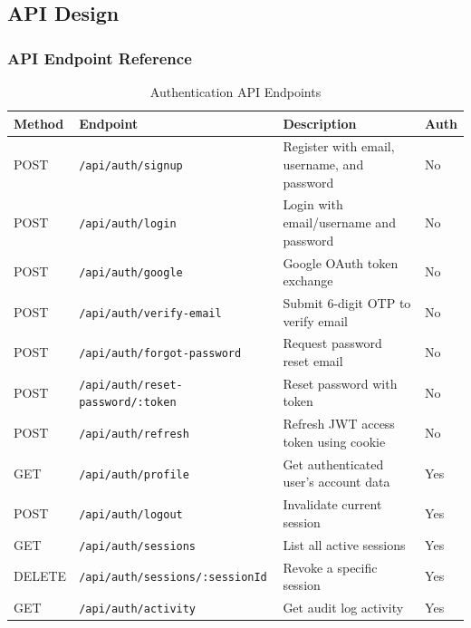 \documentclass[12pt, a4paper, oneside]{report}
\begin{document}
\subsection{API Design}

\subsubsection{API Endpoint Reference}

\begin{table}[H]
\centering
\caption{Authentication API Endpoints}
\label{tab:api_auth}
\renewcommand{\arraystretch}{1.4}
\begin{tabularx}{\textwidth}{|p{1.5cm}|p{5cm}|X|p{1.5cm}|}
\hline
\textbf{Method} & \textbf{Endpoint} & \textbf{Description} & \textbf{Auth} \\
\hline
POST & \texttt{/api/auth/signup} & Register with email, username, and password & No \\
\hline
POST & \texttt{/api/auth/login} & Login with email/username and password & No \\
\hline
POST & \texttt{/api/auth/google} & Google OAuth token exchange \cite{oauth2012} & No \\
\hline
POST & \texttt{/api/auth/verify-email} & Submit 6-digit OTP to verify email & No \\
\hline
POST & \texttt{/api/auth/forgot-password} & Request password reset email & No \\
\hline
POST & \texttt{/api/auth/reset-password/:token} & Reset password with token & No \\
\hline
POST & \texttt{/api/auth/refresh} & Refresh JWT access token using cookie & No \\
\hline
GET & \texttt{/api/auth/profile} & Get authenticated user's account data & Yes \\
\hline
POST & \texttt{/api/auth/logout} & Invalidate current session & Yes \\
\hline
GET & \texttt{/api/auth/sessions} & List all active sessions & Yes \\
\hline
DELETE & \texttt{/api/auth/sessions/:sessionId} & Revoke a specific session & Yes \\
\hline
GET & \texttt{/api/auth/activity} & Get audit log activity & Yes \\
\hline
\end{tabularx}
\end{table}
\end{document}
